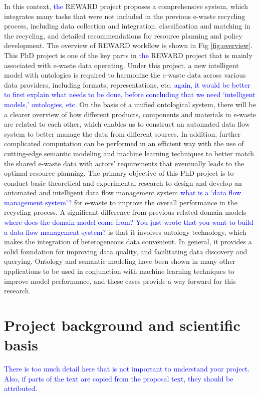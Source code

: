 \documentclass{article}
\newcommand{\MGcomment}[1]{\textcolor{blue}{#1}}
\numberwithin{equation}{section}
\begin{document}
In this context, \MGcomment{the} REWARD project proposes a comprehensive system, which integrates many tasks that were not included in the previous e-waste recycling process, including data collection and integration, classification and matching in the recycling, and detailed recommendations for resource planning and policy development. The overview of REWARD workflow is shown in Fig \ref{fig:overview}. This PhD project is one of the key parts in \MGcomment{the} REWARD project that is mainly associated with e-waste data operating. Under this project, a new intelligent model with ontologies is required to harmonize the e-waste data across various data providers, including formats, representations, etc. \MGcomment{again, it would be better to first explain what needs to be done, before concluding that we need ‘intelligent models,’ ontologies, etc.} On the basis of a unified ontological system, there will be a clearer overview of how different products, components and materials in e-waste are related to each other, which enables us to construct an automated data flow system to better manage the data from different sources. In addition, further complicated computation can be performed in an efficient way with the use of cutting-edge semantic modeling and machine learning techniques to better match the shared e-waste data with actors’ requirements that eventually leads to the optimal resource planning. 
The primary objective of this PhD project is to conduct basic theoretical and experimental research to design and develop an automated and intelligent data flow management system \MGcomment{what is a ‘data flow management system’?} for e-waste to improve the overall performance in the recycling process. A significant difference from previous related domain models \MGcomment{where does the domain model come from? You just wrote that you want to build a data flow management system?} is that it involves ontology technology, which makes the integration of heterogeneous data convenient. In general, it provides a solid foundation for improving data quality, and facilitating data discovery and querying. Ontology and semantic modeling have been shown in many other applications to be used in conjunction with machine learning techniques to improve model performance, and these cases provide a way forward for this research.

\section{Project background and scientific basis}
\MGcomment{There is too much detail here that is not important to understand your project. Also, if parts of the text are copied from the proposal text, they should be attributed.}
\end{document}
